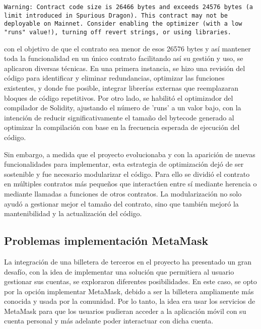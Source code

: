 \begin{verbatim}
Warning: Contract code size is 26466 bytes and exceeds 24576 bytes (a limit introduced in Spurious Dragon). This contract may not be deployable on Mainnet. Consider enabling the optimizer (with a low "runs" value!), turning off revert strings, or using libraries.
\end{verbatim}

con el objetivo de que el contrato sea menor de esos 26576 bytes y así mantener toda la funcionalidad en un único contrato facilitando así su gestión y uso, se aplicaron diversas técnicas.
En una primera instancia, se hizo una revisión del código para identificar y eliminar redundancias, optimizar las funciones existentes, y donde fue posible, integrar librerías externas que reemplazaran bloques de código repetitivos.
Por otro lado, se habilitó el optimizador del compilador de Solidity, ajustando el número de 'runs' a un valor bajo, con la intención de reducir significativamente el tamaño del bytecode generado al optimizar la compilación con base en la frecuencia esperada de ejecución del código.

Sin embargo, a medida que el proyecto evolucionaba y con la aparición de nuevas funcionalidades para implementar, esta estrategia de optimización dejó de ser sostenible y fue necesario modularizar el código. 
Para ello se dividió el contrato en múltiples contratos más pequeños que interactúen entre sí mediante herencia o mediante llamadas a funciones de otros contratos.
La modularización no solo ayudó a gestionar mejor el tamaño del contrato, sino que también mejoró la mantenibilidad y la actualización del código.



\subsection{Problemas implementación MetaMask}

La integración de una billetera de terceros en el proyecto ha presentado un gran desafío, con la idea de implementar una solución que permitiera al usuario gestionar sus cuentas, se exploraron diferentes posibilidades.
En este caso, se opto por la opción implementar MetaMask, debido a ser la billetera ampliamente más conocida y usada por la comunidad. 
Por lo tanto, la idea era usar los servicios de MetaMask para que los usuarios pudieran acceder a la aplicación móvil con su cuenta personal y más adelante poder interactuar con dicha cuenta.

